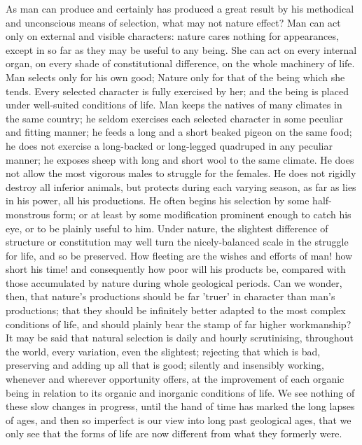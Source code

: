 \indent As man can produce and certainly has produced a great result by his methodical and unconscious means of selection, what may not nature effect? Man can act only on external and visible characters: nature cares nothing for appearances, except in so far as they may be useful to any being. She can act on every internal organ, on every shade of constitutional difference, on the whole machinery of life.  Man selects only for his own good; Nature only for that of the being which she tends. Every selected character is fully exercised by her; and the being is placed under well-suited conditions of life. Man keeps the natives of many climates in the same country; he seldom exercises each selected character in some peculiar and fitting manner; he feeds a long and a short beaked pigeon on the same food; he does not exercise a long-backed or long-legged quadruped in any peculiar manner; he exposes sheep with long and short wool to the same climate.  He does not allow the most vigorous males to struggle for the females. He does not rigidly destroy all inferior animals, but protects during each varying season, as far as lies in his power, all his productions. He often begins his selection by some half-monstrous form; or at least by some modification prominent enough to catch his eye, or to be plainly useful to him. Under nature, the slightest difference of structure or constitution may well turn the nicely-balanced scale in the struggle for life, and so be preserved.  How fleeting are the wishes and efforts of man!  how short his time!  and consequently how poor will his products be, compared with those accumulated by nature during whole geological periods. Can we wonder, then, that nature's productions should be far 'truer' in character than man's productions; that they should be infinitely better adapted to the most complex conditions of life, and should plainly bear the stamp of far higher workmanship? \\
\indent It may be said that natural selection is daily and hourly scrutinising, throughout the world, every variation, even the slightest; rejecting that which is bad, preserving and adding up all that is good; silently and insensibly working, whenever and wherever opportunity offers, at the improvement of each organic being in relation to its organic and inorganic conditions of life. We see nothing of these slow changes in progress, until the hand of time has marked the long lapses of ages, and then so imperfect is our view into long past geological ages, that we only see that the forms of life are now different from what they formerly were. \\
